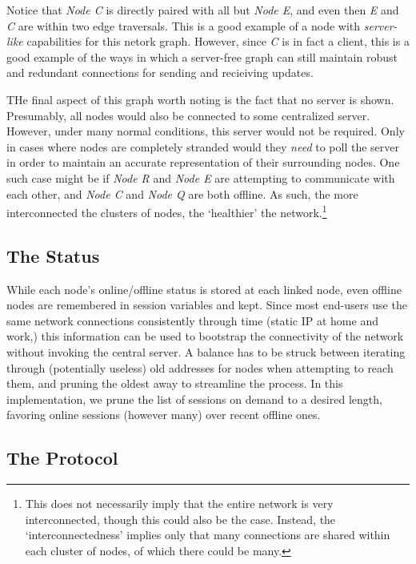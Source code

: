 \documentclass[11pt]{article}
\begin{document}
Notice that \emph{Node C} is directly paired with all but \emph{Node E}, and even then \emph{E} and \emph{C} are within two edge traversals. This is a good example of a node with \emph{server-like} capabilities for this netork graph. However, since \emph{C} is in fact a client, this is a good example of the ways in which a server-free graph can still maintain robust and redundant connections for sending and recieiving updates.

THe final aspect of this graph worth noting is the fact that no server is shown. Presumably, all nodes would also be connected to some centralized server. However, under many normal conditions, this server would not be required. Only in cases where nodes are completely stranded would they \emph{need} to poll the server in order to maintain an accurate representation of their surrounding nodes. One such case might be if \emph{Node R} and \emph{Node E} are attempting to communicate with each other, and \emph{Node C} and \emph{Node Q} are both offline. As such, the more interconnected the clusters of nodes, the `healthier' the network.\footnote{This does not necessarily imply that the entire network is very interconnected, though this could also be the case. Instead, the `interconnectedness' implies only that many connections are shared within each cluster of nodes, of which there could be many.}

\subsection{The Status}

While each node's online/offline status is stored at each linked node, even offline nodes are remembered in session variables and kept. Since most end-users use the same network connections consistently through time (static IP at home and work,) this information can be used to bootstrap the connectivity of the network without invoking the central server. A balance has to be struck between iterating through (potentially useless) old addresses for nodes when attempting to reach them, and pruning the oldest away to streamline the process. In this implementation, we prune the list of sessions on demand to a desired length, favoring online sessions (however many) over recent offline ones.
   
\subsection{The Protocol}
\end{document}
